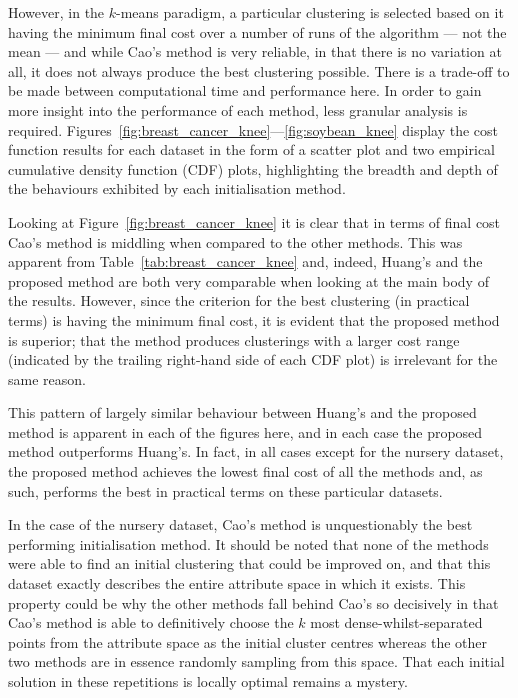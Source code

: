 However, in the \(k\)-means paradigm, a particular clustering is selected based
on it having the minimum final cost over a number of runs of the algorithm ---
not the mean --- and while Cao's method is very reliable, in that there is no
variation at all, it does not always produce the best clustering possible. There
is a trade-off to be made between computational time and performance here. In
order to gain more insight into the performance of each method, less granular
analysis is required.
Figures~\ref{fig:breast_cancer_knee}---\ref{fig:soybean_knee} display the
cost function results for each dataset in the form of a scatter plot and two
empirical cumulative density function (CDF) plots, highlighting the breadth and
depth of the behaviours exhibited by each initialisation method.

Looking at Figure~\ref{fig:breast_cancer_knee} it is clear that in terms of
final cost Cao's method is middling when compared to the other methods. This
was apparent from Table~\ref{tab:breast_cancer_knee} and, indeed, Huang's and
the proposed method are both very comparable when looking at the main body of
the results. However, since the criterion for the best clustering (in practical
terms) is having the minimum final cost, it is evident that the proposed method
is superior; that the method produces clusterings with a larger cost
range (indicated by the trailing right-hand side of each CDF plot) is irrelevant
for the same reason.

This pattern of largely similar behaviour between Huang's and the proposed
method is apparent in each of the figures here, and in each case the proposed
method outperforms Huang's. In fact, in all cases except for the nursery
dataset, the proposed method achieves the lowest final cost of all the methods
and, as such, performs the best in practical terms on these particular datasets.

In the case of the nursery dataset, Cao's method is unquestionably the best
performing initialisation method. It should be noted that none of the
methods were able to find an initial clustering that could be improved on, and
that this dataset exactly describes the entire attribute space in which it
exists. This property could be why the other methods fall behind Cao's so
decisively in that Cao's method is able to definitively choose the \(k\) most
dense-whilst-separated points from the attribute space as the initial cluster
centres whereas the other two methods are in essence randomly sampling from this
space. That each initial solution in these repetitions is locally optimal
remains a mystery.


